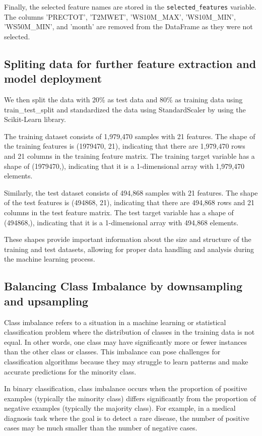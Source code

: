\documentclass{article}
\begin{document}
Finally, the selected feature names are stored in the \texttt{selected\_features} variable. The columns 'PRECTOT', 'T2MWET', 'WS10M\_MAX', 'WS10M\_MIN', 'WS50M\_MIN', and 'month' are removed from the DataFrame as they were not selected. 

\subsection{Spliting data for further feature extraction and model deployment}


We then split the data with 20\% as test data and 80\% as training data using train\_test\_split and standardized the data using StandardScaler by using the Scikit-Learn library. 

The training dataset consists of 1,979,470 samples with 21 features. The shape of the training features is (1979470, 21), indicating that there are 1,979,470 rows and 21 columns in the training feature matrix. The training target variable has a shape of (1979470,), indicating that it is a 1-dimensional array with 1,979,470 elements. 

Similarly, the test dataset consists of 494,868 samples with 21 features. The shape of the test features is (494868, 21), indicating that there are 494,868 rows and 21 columns in the test feature matrix. The test target variable has a shape of (494868,), indicating that it is a 1-dimensional array with 494,868 elements. 

These shapes provide important information about the size and structure of the training and test datasets, allowing for proper data handling and analysis during the machine learning process.

\subsection{Balancing Class Imbalance by downsampling and upsampling}
Class imbalance refers to a situation in a machine learning or statistical classification problem where the distribution of classes in the training data is not equal. In other words, one class may have significantly more or fewer instances than the other class or classes. This imbalance can pose challenges for classification algorithms because they may struggle to learn patterns and make accurate predictions for the minority class.

In binary classification, class imbalance occurs when the proportion of positive examples (typically the minority class) differs significantly from the proportion of negative examples (typically the majority class). For example, in a medical diagnosis task where the goal is to detect a rare disease, the number of positive cases may be much smaller than the number of negative cases.
\end{document}
